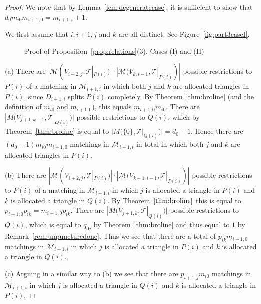 \documentclass[a4paper]{amsart}
\begin{document}
\begin{proof}
We note that by Lemma~\ref{lem:degeneratecase}, it is sufficient to show
that $d_0m_{i0}m_{i+1,0}=m_{i+1,i}+1$.

We first assume that $i,i+1,j$ and $k$ are all distinct.
See Figure~\ref{fig:part3caseI}.

\begin{figure}\label{fig:part3caseIandII}
\begin{center}
\hskip 2cm
\end{center}
\caption{Proof of Proposition~\ref{prop:relations}(3), Cases (I) and (II)}
\end{figure}

(a) There are $|{\mathcal M}(V_{i+2,j},{\mathcal T}|_{P(i)})|\cdot |{\mathcal M}(V_{k,i-1},{\mathcal T}|_{P(i)})|$
possible restrictions to $P(i)$ of a matching in ${\mathcal M}_{i+1,i}$
in which both $j$ and $k$ are allocated triangles in $P(i)$,
since $D_{i+1,i}$ splits $P(i)$ completely.
By Theorem~\ref{thm:broline} (and the definition of $m_{i0}$ and $m_{i+1,0}$),
this equals $m_{i+1,0}m_{i0}$.
There are $|M(V_{j+1,k-1},{\mathcal T}|_{Q(i)})|$
possible restrictions to $Q(i)$, which by
Theorem~\ref{thm:broline} is equal to
$|M(\{0\},{\mathcal T}|_{Q(i)})|=d_0-1$.
Hence there are $(d_0-1)m_{i0}m_{i+1,0}$ matchings in ${\mathcal M}_{i+1,i}$
in total in which both $j$ and $k$ are allocated triangles in $P(i)$.

(b) There are
$|{\mathcal M}(V_{i+2,j},{\mathcal T}|_{P(i)})|\cdot |{\mathcal M}(V_{k+1,i-1},{\mathcal T}|_{P(i)})|$
possible restrictions to $P(i)$ of a matching in ${\mathcal M}_{i+1,i}$ in
which $j$ is allocated a triangle in $P(i)$ and $k$ is allocated
a triangle in $Q(i)$. By Theorem~$\ref{thm:broline}$ this is equal to
$p_{i+1,0}p_{ik}=m_{i+1,0}p_{ik}$. There are
$|M(V_{j+1,k},{\mathcal T}|_{Q(i)})|$
possible restrictions to $Q(i)$, which is equal to $q_{0j}$ by
Theorem~\ref{thm:broline} and thus equal to $1$ by
Remark~\ref{rem:unpuncturedone}.
Thus we see that there are a total
of $p_{ik}m_{i+1,0}$ matchings in ${\mathcal M}_{i+1,i}$ in which $j$ is
allocated a triangle in $P(i)$ and $k$ is allocated a triangle in $Q(i)$.

(c) Arguing in a similar way to (b) we see that there are $p_{i+1,j}m_{i0}$
matchings in ${\mathcal M}_{i+1,i}$ in which $j$ is allocated a triangle in
$Q(i)$ and $k$ is allocated a triangle in $P(i)$. 


\end{proof}
\end{document}
